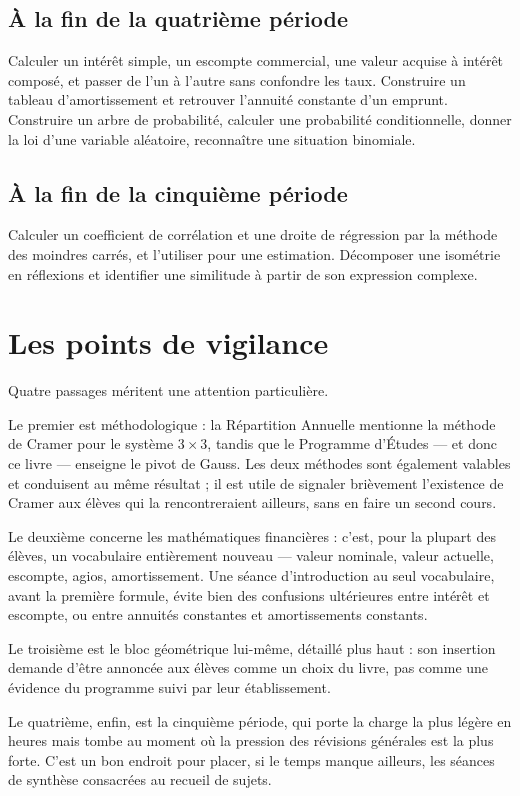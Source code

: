\subsection*{À la fin de la quatrième période}

Calculer un intérêt simple, un escompte commercial, une valeur acquise à
intérêt composé, et passer de l'un à l'autre sans confondre les taux.
Construire un tableau d'amortissement et retrouver l'annuité constante d'un
emprunt. Construire un arbre de probabilité, calculer une probabilité
conditionnelle, donner la loi d'une variable aléatoire, reconnaître une
situation binomiale.

\subsection*{À la fin de la cinquième période}

Calculer un coefficient de corrélation et une droite de régression par la
méthode des moindres carrés, et l'utiliser pour une estimation. Décomposer
une isométrie en réflexions et identifier une similitude à partir de son
expression complexe.

\section*{Les points de vigilance}

Quatre passages méritent une attention particulière.

Le premier est méthodologique : la Répartition Annuelle mentionne la
méthode de Cramer pour le système $3\times3$, tandis que le Programme
d'Études — et donc ce livre — enseigne le pivot de Gauss. Les deux méthodes
sont également valables et conduisent au même résultat ; il est utile de
signaler brièvement l'existence de Cramer aux élèves qui la rencontreraient
ailleurs, sans en faire un second cours.

Le deuxième concerne les mathématiques financières : c'est, pour la plupart
des élèves, un vocabulaire entièrement nouveau — valeur nominale, valeur
actuelle, escompte, agios, amortissement. Une séance d'introduction au seul
vocabulaire, avant la première formule, évite bien des confusions
ultérieures entre intérêt et escompte, ou entre annuités constantes et
amortissements constants.

Le troisième est le bloc géométrique lui-même, détaillé plus haut : son
insertion demande d'être annoncée aux élèves comme un choix du livre, pas
comme une évidence du programme suivi par leur établissement.

Le quatrième, enfin, est la cinquième période, qui porte la charge la plus
légère en heures mais tombe au moment où la pression des révisions
générales est la plus forte. C'est un bon endroit pour placer, si le temps
manque ailleurs, les séances de synthèse consacrées au recueil de sujets.
